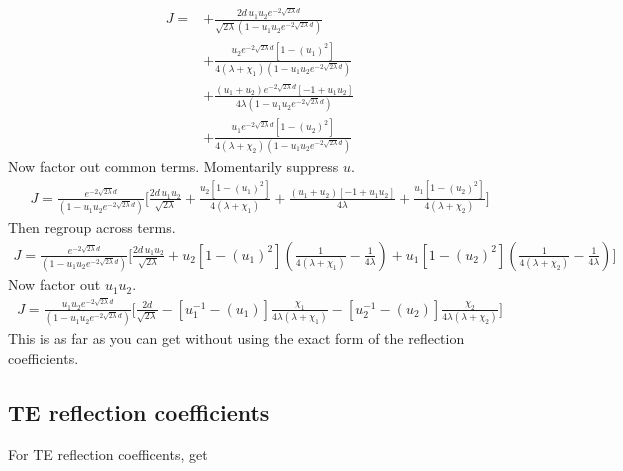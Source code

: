 \begin{align*}
  J=&+\frac{2d\,u_1u_2 e^{-2\sqrt{2\lambda}d}}{\sqrt{2\lambda}(1-u_1u_2 e^{-2\sqrt{2\lambda}d})}\nonumber\\
  &+\frac{u_2 e^{-2\sqrt{2\lambda}d}[1 - (u_1)^2]}{4(\lambda+\chi_1)(1-u_1u_2 e^{-2\sqrt{2\lambda}d})} 
    \\
    & +\frac{(u_1 +u_2)e^{-2\sqrt{2\lambda}d}[-1+u_1u_2]}
    {4\lambda(1-u_1u_2 e^{-2\sqrt{2\lambda}d})}\\
    &+\frac{u_1 e^{-2\sqrt{2\lambda}d}[1-(u_2)^2]}{4(\lambda+\chi_2)(1-u_1u_2 e^{-2\sqrt{2\lambda}d})}
  \end{align*}
Now factor out common terms.  Momentarily suppress $u$.
\begin{align*}
  J=\frac{e^{-2\sqrt{2\lambda}d}}{(1-u_1u_2 e^{-2\sqrt{2\lambda}d})}
    \bigg[\frac{2d\,u_1u_2 }{\sqrt{2\lambda}}
  +\frac{u_2 [1 - (u_1)^2]}{4(\lambda+\chi_1)} 
     +\frac{(u_1 +u_2)[-1+u_1u_2]}
    {4\lambda}
    +\frac{u_1[1-(u_2)^2]}{4(\lambda+\chi_2)}\bigg]
  \end{align*}
Then regroup across terms.  
\begin{align*}
  J=\frac{e^{-2\sqrt{2\lambda}d}}{(1-u_1u_2 e^{-2\sqrt{2\lambda}d})}
    \bigg[\frac{2d\,u_1u_2 }{\sqrt{2\lambda}}
    +u_2 [1 - (u_1)^2]\left(\frac{1}{4(\lambda+\chi_1)}-\frac{1}{4\lambda} \right)
    +u_1[1-(u_2)^2]\left(\frac{1}{4(\lambda+\chi_2)}-\frac{1}{4\lambda}\right)\bigg]
  \end{align*}
Now factor out $u_1u_2$.  
\begin{align*}
  J=\frac{u_1u_2e^{-2\sqrt{2\lambda}d}}{(1-u_1u_2 e^{-2\sqrt{2\lambda}d})}
    \bigg[\frac{2d}{\sqrt{2\lambda}}
    -[u_1^{-1} - (u_1)]\frac{\chi_1}{4\lambda(\lambda+\chi_1)}
    -[u_2^{-1}-(u_2)]\frac{\chi_2}{4\lambda(\lambda+\chi_2)}\bigg]
  \end{align*}
This is as far as you can get without using the exact form of the reflection coefficients.  
\subsection{TE reflection coefficients}
For TE reflection coefficents, get

